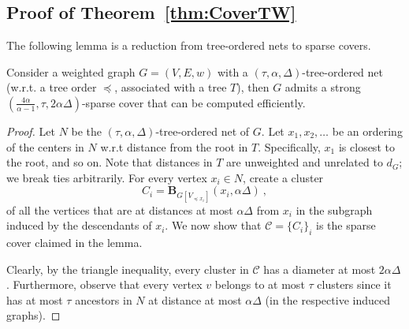 \documentclass{theoretics}
\def\ball{\mathbf{B}}
\begin{document}
\subsection{Proof of Theorem~\ref{thm:CoverTW}}\label{subsec:covertw}
The following lemma is a reduction from tree-ordered nets to sparse covers.
\begin{lemma}\label{lem:NetToCover}
	Consider a weighted graph $G=(V,E,w)$ with a $(\tau,\alpha,\Delta)$-tree-ordered net (w.r.t. a tree order $\preceq$, associated with a tree $T$), then $G$ admits a  strong 
	 $\left(\frac{4\alpha}{\alpha-1},\tau,2\alpha\Delta\right)$-sparse cover that can be computed efficiently.
\end{lemma}
\begin{proof}Let $N$ be the $(\tau,\alpha,\Delta)$-tree-ordered net of $G$.  Let $x_1,x_2,\dots$ be an ordering of the centers in $N$ w.r.t distance from the root in $T$. Specifically, $x_1$ is closest to the root, and so on. Note that distances in $T$ are unweighted and unrelated to $d_G$; we break ties arbitrarily. For every vertex $x_i\in N$, create a cluster
	\[
	C_{i}=\ball_{G[V_{\preceq x_{i}}]}(x_i,\alpha\Delta)~,
	\]
	of all the vertices that are at distances at most $\alpha\Delta$ from $x_i$ in the subgraph induced by the descendants of $x_i$. We now show that $\mathcal{C} = \{C_i\}_i$ is the sparse cover claimed in the lemma.
	
	
	Clearly, by the triangle inequality, every cluster in $\mathcal{C}$ has a diameter at most $2\alpha\Delta$. Furthermore, observe that every vertex $v$ belongs to at most $\tau$ clusters since it has at most $\tau$ ancestors in $N$ at distance at most $\alpha\Delta$ (in the respective induced graphs).
	

\end{proof}
\end{document}
